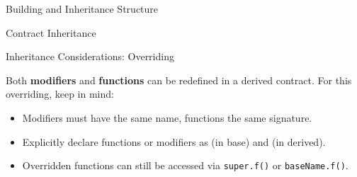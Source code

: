 \documentclass[]{beamer}
\begin{document}
\begin{frame}{Building and Inheritance Structure}

\vspace{0.5em}	
\begin{minipage}{0.48\textwidth}
	\begin{samplecode}{Contract Inheritance}
		
	\end{samplecode}
\end{minipage}	
\begin{minipage}{0.48\textwidth}
	\begin{figure}[t]
		\centering
		\begin{tikzpicture}[scale=1.0, every node/.style={scale=1.0}]
			
		\end{tikzpicture}
	\end{figure}
\end{minipage}	

\vspace{2.0em}


\end{frame}


\begin{frame}{Inheritance Considerations: Overriding}

Both \textbf{modifiers} and \textbf{functions} can be redefined in a derived contract. For this overriding, keep in mind:
\vspace{0.5em}
\begin{itemize}
	\item<2-> Modifiers must have the same name, functions the same signature.
	\item<3-> Explicitly declare functions or modifiers as  (in base) and  (in derived).
	\item<4->  Overridden functions can still be accessed via \texttt{super.f()} or \texttt{baseName.f()}.	
\end{itemize}

\vspace{1.5em}


\end{frame}
\end{document}
